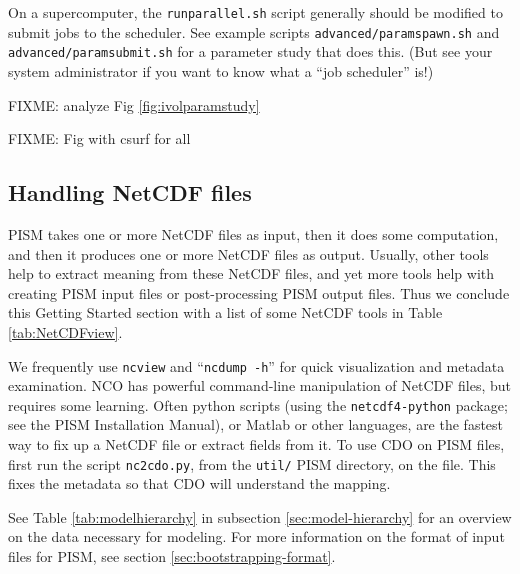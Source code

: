 On a supercomputer, the \texttt{runparallel.sh} script generally should be modified to submit jobs to the scheduler.  See example scripts \texttt{advanced/paramspawn.sh} and \texttt{advanced/paramsubmit.sh} for a parameter study that does this.  (But see your system administrator if you want to know what a ``job scheduler'' is!)

FIXME: analyze Fig \ref{fig:ivolparamstudy}

FIXME: Fig with csurf for all

\clearpage

\subsection{Handling NetCDF files}\label{subsect:nctoolsintro}  PISM takes one or more NetCDF files as input, then it does some computation, and then it produces one or more NetCDF files as output.  Usually, other tools help to extract meaning from these NetCDF files, and yet more tools help with creating PISM input files or post-processing PISM output files.  Thus we conclude this Getting Started section with a list of some NetCDF tools in Table \ref{tab:NetCDFview}.

We frequently use \texttt{ncview} and ``\texttt{ncdump -h}'' for quick visualization and metadata examination.  NCO has powerful command-line manipulation of NetCDF files, but requires some learning.  Often python scripts (using the \texttt{netcdf4-python} package; see the PISM Installation Manual), or Matlab or other languages, are the fastest way to fix up a NetCDF file or extract fields from it.  To use CDO on PISM files, first run the script \texttt{nc2cdo.py}, from the \texttt{util/} PISM directory, on the file.  This fixes the metadata so that CDO will understand the mapping.

See Table \ref{tab:modelhierarchy} in subsection \ref{sec:model-hierarchy} for an overview on the data necessary for modeling.  For more information on the format of input files for PISM, see section \ref{sec:bootstrapping-format}.

